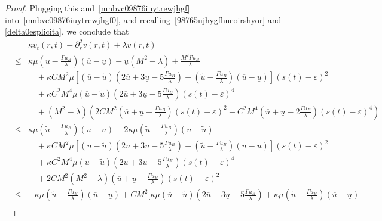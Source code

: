 \documentclass[12pt,a4paper,intlimits,sumlimits]{amsart}
\theoremstyle{definition}
\theoremstyle{plain}
\numberwithin{equation}{section}
\renewcommand{\leq}{\leqslant}
\renewcommand{\le}{\leqslant}
\begin{document}
\begin{proof}
Plugging this and~\eqref{mnbvc09876iuytrewjhgf} into~\eqref{mnbvc09876iuytrewjhgf0}, and recalling~\eqref{98765ujhygfhueoirshyor} and \eqref{delta0esplicita},
we conclude that
\begin{eqnarray*}&&
\kappa v_t(r, t)- \partial^2_r v(r, t) +\lambda v(r, t) \\&\le& 
\kappa\mu\left(\widetilde u-\frac{\Gamma u_B}{\lambda} \right)(\overline{u}-\underline{u}) -\underline{u}(M^2-\lambda)+\frac{M^2\Gamma u_B}{\lambda}\\
&&\quad+\kappa CM^2\mu\left[(\overline u-\widetilde u)\left(2\overline u+3\underline u-5\frac{\Gamma u_B}{\lambda} \right)+\left(\widetilde u-\frac{\Gamma u_B}{\lambda} \right)(\overline{u}-\underline{u})\right](s(t)-\varepsilon)^2 \\
&&\quad +\kappa C^2M^4\mu(\overline u-\widetilde u)\left(2\overline u+3\underline u-5\frac{\Gamma u_B}{\lambda} \right)(s(t)-\varepsilon)^4
\\
&&\quad+(M^2-\lambda)\left(2CM^2\left(\overline u+\underline u -\frac{\Gamma u_B}{\lambda}\right)(s(t)-\varepsilon)^2-C^2M^4\left(\overline u+\underline u -2\frac{\Gamma u_B}{\lambda}\right)(s(t)-\varepsilon)^4 \right) \\
&\leq&
\kappa\mu\left(\widetilde u-\frac{\Gamma u_B}{\lambda} \right)(\overline{u}-\underline{u}) 
-   2\kappa\mu\left(\widetilde u-\frac{\Gamma u_B}{\lambda} \right)(\overline{u} -\widetilde u)  \\
&&\quad+\kappa CM^2\mu\left[(\overline u-\widetilde u)\left(2\overline u+3\underline u-5\frac{\Gamma u_B}{\lambda} \right)+\left(\widetilde u-\frac{\Gamma u_B}{\lambda} \right)(\overline{u}-\underline{u})\right](s(t)-\varepsilon)^2 \\
&&\quad +\kappa C^2M^4\mu(\overline u-\widetilde u)\left(2\overline u+3\underline u-5\frac{\Gamma u_B}{\lambda} \right)(s(t)-\varepsilon)^4 \\
&&\quad +2CM^2(M^2-\lambda)\left(\overline u+\underline u -\frac{\Gamma u_B}{\lambda}\right)(s(t)-\varepsilon)^2
\\&\leq&-\kappa\mu\left(\widetilde u-\frac{\Gamma u_B}{\lambda} \right)(\overline{u}-\underline{u}) +CM^2\Bigg[\kappa\mu(\overline u-\widetilde u)\left(2\overline u+3\underline u-5\frac{\Gamma u_B}{\lambda} \right)+\kappa \mu \left(\widetilde u-\frac{\Gamma u_B}{\lambda} \right)(\overline{u}-\underline{u}) \\

\end{eqnarray*}
\end{proof}
\end{document}
